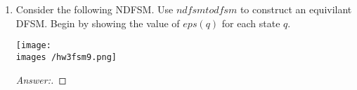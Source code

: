 \documentclass[10pt]{article}
\newcommand{\images}{/home/gparker/classes/341/images}
\begin{document}
\begin{enumerate}
\begin{enumerate}
\item
$\{a^nba^m : n, m \geq 0, n \equiv _3 m\}$.
\begin{proof}[Answer:]
\end{proof}

\item
$\{w \in \{o, 1\}^* : w$ contains both $101$ and $010$ as substrings\}.
\begin{proof}[Answer:]
\end{proof}
\end{enumerate}

\addtocounter{enumi}{2}

\item
Consider the following NDFSM. Use $ndfsmtodfsm$ to construct an equivilant DFSM.  Begin by showing the value of $eps(q)$ for each state $q$.

\begin{center}
\texttt{[image: \\images /hw3fsm9.png]}
\end{center}
\begin{proof}[Answer:]
\end{proof}
\end{enumerate}
\end{document}
